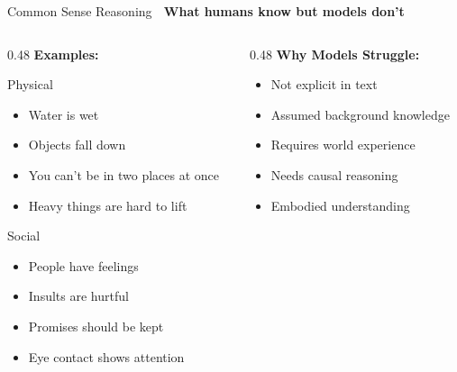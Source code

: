 \documentclass[aspectratio=169]{beamer}
\begin{document}
\begin{frame}[shrink=10]{Common Sense Reasoning 🤯}
\textbf{What humans know but models don't}

\vspace{1em}

\begin{columns}[T]
\begin{column}{0.48\textwidth}
\textbf{Examples:}

\vspace{0.3em}
\begin{exampleblock}{Physical}
\begin{itemize}\setlength{\itemsep}{0pt}
    \item Water is wet
    \item Objects fall down
    \item You can't be in two places at once
    \item Heavy things are hard to lift
\end{itemize}
\end{exampleblock}

\vspace{0.3em}
\begin{exampleblock}{Social}
\begin{itemize}\setlength{\itemsep}{0pt}
    \item People have feelings
    \item Insults are hurtful
    \item Promises should be kept
    \item Eye contact shows attention
\end{itemize}
\end{exampleblock}
\end{column}

\begin{column}{0.48\textwidth}
\textbf{Why Models Struggle:}
\begin{itemize}\setlength{\itemsep}{0pt}
    \item Not explicit in text
    \item Assumed background knowledge
    \item Requires world experience
    \item Needs causal reasoning
    \item Embodied understanding
\end{itemize}


\end{column}
\end{columns}
\end{frame}
\end{document}
